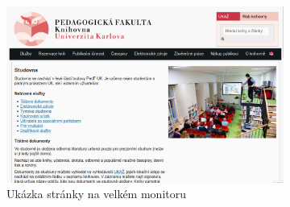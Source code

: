 \documentclass{csbulletin}
\begin{document}
\begin{figure}[tbp]
  \caption{Ukázka zobrazení webové stránky s využitím responzivního designu}
  \label{fig:responzivni}
\begin{subfigure}[t]{0.74\textwidth}
    \includegraphics[width=\textwidth]{img/pedf-web-big.png}
    \caption{Ukázka stránky na velkém monitoru}
\end{subfigure}
\hfill
\begin{subfigure}[t]{0.24\textwidth}

\end{subfigure}
\end{figure}
\end{document}
